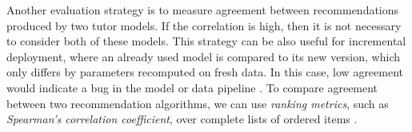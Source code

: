 Another evaluation strategy is to measure agreement between recommendations
produced by two tutor models. If the correlation is high, then it is not
necessary to consider both of these models. This strategy can be also useful
for incremental deployment, where an already used model is compared to its
new version, which only differs by parameters recomputed on fresh data.
In this case, low agreement would indicate a bug in the model
or data pipeline \cite[][Rule 24]{google-ml-rules}.
To compare agreement between two recommendation algorithms, we can use
\emph{ranking metrics}, such as \emph{Spearman's correlation coefficient},
over complete lists of ordered items
\cite[section\,8.3.2.3]{recsys}.



